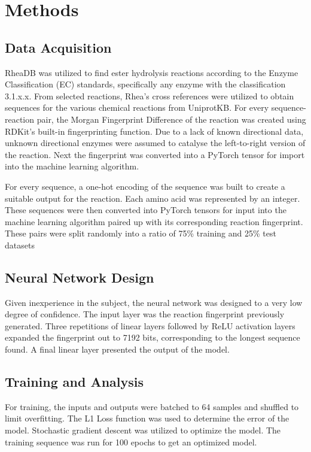 \documentclass[12pt]{article}
\begin{document}
\section{Methods}
\subsection{Data Acquisition}
RheaDB was utilized to find ester hydrolysis reactions according to the Enzyme Classification
(EC) standards, specifically any enzyme with the classification 3.1.x.x. From selected reactions, Rhea's cross references were utilized
to obtain sequences for the various chemical reactions from UniprotKB. For every
sequence-reaction pair, the Morgan Fingerprint Difference of the reaction was created using
RDKit's built-in fingerprinting function. Due to a lack of known directional data,
unknown directional enzymes were assumed to catalyse the left-to-right version of
the reaction. Next the fingerprint was converted into a PyTorch tensor for import
into the machine learning algorithm.

For every sequence, a one-hot encoding of the sequence was built to create a suitable
output for the reaction. Each amino acid was represented by an integer.
These sequences were then converted into PyTorch tensors
for input into the machine learning algorithm paired up with its corresponding reaction fingerprint.
These pairs were split randomly into a ratio of 75\% training and 25\% test datasets

\subsection{Neural Network Design}
Given inexperience in the subject, the neural network was designed to a very low
degree of confidence. The input layer was the reaction fingerprint previously generated.
Three repetitions of linear layers followed by ReLU activation layers expanded the
fingerprint out to 7192 bits, corresponding to the longest sequence found. A final
linear layer presented the output of the model.

\subsection{Training and Analysis}
For training, the inputs and outputs were batched to 64 samples and shuffled to
limit overfitting. The L1 Loss function was used to determine the error of the
model. Stochastic gradient descent was utilized to optimize the model.
The training sequence was run for 100 epochs to get an optimized model.
\end{document}
